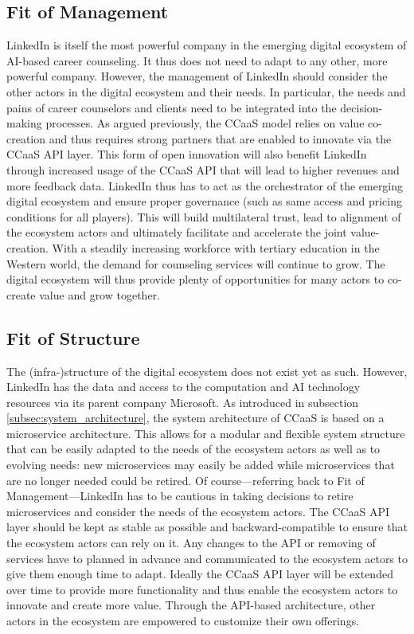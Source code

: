 \subsection{Fit of Management}

LinkedIn is itself the most powerful company in the emerging digital ecosystem of AI-based career
counseling. It thus does not need to adapt to any other, more powerful company. However, the management
of LinkedIn should consider the other actors in the digital ecosystem and their needs. In particular,
the needs and pains of career counselors and clients need to be integrated into the decision-making
processes. As argued previously, the CCaaS model relies on value co-creation and thus requires strong 
partners that are enabled to innovate via the CCaaS API layer. This form of open innovation will also 
benefit LinkedIn through increased usage of the CCaaS API that will lead to higher revenues and more
feedback data. LinkedIn thus has to act as the orchestrator of the emerging digital ecosystem and
ensure proper governance (such as same access and pricing conditions for all players). This will build
multilateral trust, lead to alignment of the ecosystem actors and ultimately facilitate and accelerate
the joint value-creation. With a steadily increasing workforce with tertiary education in the Western
world, the demand for counseling services will continue to grow. The digital ecosystem will thus 
provide plenty of opportunities for many actors to co-create value and grow together.


\subsection{Fit of Structure}

The (infra-)structure of the digital ecosystem does not exist yet as such. However, LinkedIn has the
data and access to the computation and AI technology resources via its parent company Microsoft. As
introduced in subsection \ref{subsec:system_architecture}, the system architecture of CCaaS is based 
on a microservice architecture. This allows for a modular and flexible system structure that can be
easily adapted to the needs of the ecosystem actors as well as to evolving needs: new microservices 
may easily be added while microservices that are no longer needed could be retired. Of course---referring 
back to Fit of Management---LinkedIn has to be cautious in taking decisions to retire microservices 
and consider the needs of the ecosystem actors. The CCaaS API layer should be kept as stable as possible
and backward-compatible to ensure that the ecosystem actors can rely on it. Any changes to the API 
or removing of services have to planned in advance and communicated to the ecosystem actors to give
them enough time to adapt. Ideally the CCaaS API layer will be extended over time to provide more
functionality and thus enable the ecosystem actors to innovate and create more value. Through the 
API-based architecture, other actors in the ecosystem are empowered to customize their own offerings.


